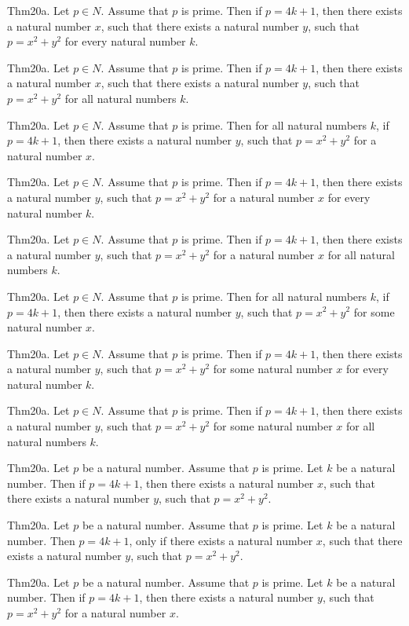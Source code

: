 \documentclass{article}
\begin{document}
Thm20a. Let $p \in N$. Assume that $p$ is prime. Then if $p = 4 k + 1$, then there exists a natural number $x$, such that there exists a natural number $y$, such that $p = x ^{ 2}+ y ^{ 2}$ for every natural number $k$.

Thm20a. Let $p \in N$. Assume that $p$ is prime. Then if $p = 4 k + 1$, then there exists a natural number $x$, such that there exists a natural number $y$, such that $p = x ^{ 2}+ y ^{ 2}$ for all natural numbers $k$.

Thm20a. Let $p \in N$. Assume that $p$ is prime. Then for all natural numbers $k$, if $p = 4 k + 1$, then there exists a natural number $y$, such that $p = x ^{ 2}+ y ^{ 2}$ for a natural number $x$.

Thm20a. Let $p \in N$. Assume that $p$ is prime. Then if $p = 4 k + 1$, then there exists a natural number $y$, such that $p = x ^{ 2}+ y ^{ 2}$ for a natural number $x$ for every natural number $k$.

Thm20a. Let $p \in N$. Assume that $p$ is prime. Then if $p = 4 k + 1$, then there exists a natural number $y$, such that $p = x ^{ 2}+ y ^{ 2}$ for a natural number $x$ for all natural numbers $k$.

Thm20a. Let $p \in N$. Assume that $p$ is prime. Then for all natural numbers $k$, if $p = 4 k + 1$, then there exists a natural number $y$, such that $p = x ^{ 2}+ y ^{ 2}$ for some natural number $x$.

Thm20a. Let $p \in N$. Assume that $p$ is prime. Then if $p = 4 k + 1$, then there exists a natural number $y$, such that $p = x ^{ 2}+ y ^{ 2}$ for some natural number $x$ for every natural number $k$.

Thm20a. Let $p \in N$. Assume that $p$ is prime. Then if $p = 4 k + 1$, then there exists a natural number $y$, such that $p = x ^{ 2}+ y ^{ 2}$ for some natural number $x$ for all natural numbers $k$.

Thm20a. Let $p$ be a natural number. Assume that $p$ is prime. Let $k$ be a natural number. Then if $p = 4 k + 1$, then there exists a natural number $x$, such that there exists a natural number $y$, such that $p = x ^{ 2}+ y ^{ 2}$.

Thm20a. Let $p$ be a natural number. Assume that $p$ is prime. Let $k$ be a natural number. Then $p = 4 k + 1$, only if there exists a natural number $x$, such that there exists a natural number $y$, such that $p = x ^{ 2}+ y ^{ 2}$.

Thm20a. Let $p$ be a natural number. Assume that $p$ is prime. Let $k$ be a natural number. Then if $p = 4 k + 1$, then there exists a natural number $y$, such that $p = x ^{ 2}+ y ^{ 2}$ for a natural number $x$.
\end{document}
